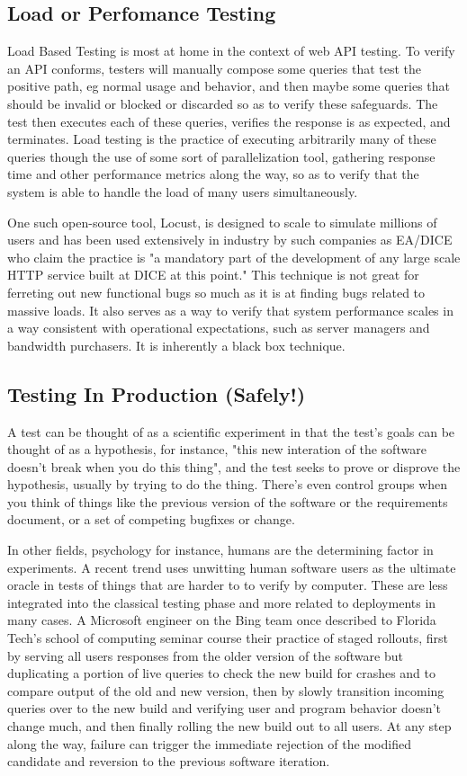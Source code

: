 \subsection{Load or Perfomance Testing}
Load Based Testing is most at home in the context of web API testing. To verify an API conforms, testers will manually compose some queries that test the positive path, eg normal usage and behavior, and then maybe some queries that should be invalid or blocked or discarded so as to verify these safeguards. The test then executes each of these queries, verifies the response is as expected, and terminates. Load testing is the practice of executing arbitrarily many of these queries though the use of some sort of parallelization tool, gathering response time and other performance metrics along the way, so as to verify that the system is able to handle the load of many users simultaneously.

One such open-source tool, Locust\citep{heymanlocust}, is designed to scale to simulate millions of users and has been used extensively in industry by such companies as EA/DICE who claim the practice is "a mandatory part of the development of any large scale HTTP service built at DICE at this point." This technique is not great for ferreting out new functional bugs so much as it is at finding bugs related to massive loads. It also serves as a way to verify that system performance scales in a way consistent with operational expectations, such as server managers and bandwidth purchasers. It is inherently a black box technique.

\subsection{Testing In Production (Safely!)}
A test can be thought of as a scientific experiment in that the test's goals can be thought of as a hypothesis, for instance, "this new interation of the software doesn't break when you do this thing", and the test seeks to prove or disprove the hypothesis, usually by trying to do the thing. There's even control groups when you think of things like the previous version of the software or the requirements document, or a set of competing bugfixes or change.

In other fields, psychology for instance, humans are the determining factor in experiments. A recent trend uses unwitting human software users as the ultimate oracle in tests of things that are harder to to verify by computer. These are less integrated into the classical testing phase and more related to deployments in many cases. A Microsoft engineer on the Bing team once described to Florida Tech's school of computing seminar course their practice of staged rollouts, first by serving all users responses from the older version of the software but duplicating a portion of live queries to check the new build for crashes and to compare output of the old and new version, then by slowly transition incoming queries over to the new build and verifying user and program behavior doesn't change much, and then finally rolling the new build out to all users. At any step along the way, failure can trigger the immediate rejection of the modified candidate and reversion to the previous software iteration.

